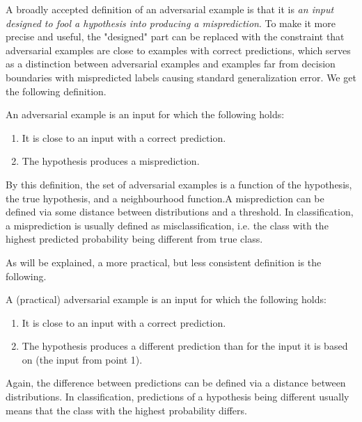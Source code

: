 \documentclass[oneside]{book}
\begin{document}
A broadly accepted definition of an adversarial example is that it is \textit{an input designed to fool a hypothesis into producing a misprediction}. To make it more precise and useful, the "designed" part can be replaced with the constraint that adversarial examples are close to examples with correct predictions, which serves as a distinction between adversarial examples and examples far from decision boundaries with mispredicted labels causing standard generalization error. We get the following definition.
\begin{definition} \label{def:ae-consistent}
	An adversarial example is an input for which the following holds:
	\begin{enumerate}
		\item It is close to an input with a correct prediction.
		\item The hypothesis produces a misprediction.
	\end{enumerate}
\end{definition}
By this definition, the set of adversarial examples is a function of the hypothesis, the true hypothesis, and a neighbourhood function.A misprediction can be defined via some distance between distributions and a threshold. In classification, a misprediction is usually defined as misclassification, i.e. the class with the highest predicted probability being different from true class.

As will be explained, a more practical, but less consistent definition is the following. 
\begin{definition} \label{def:ae-practical}
	A (practical) adversarial example is an input for which the following holds:
	\begin{enumerate}
		\item It is close to an input with a correct prediction.
		\item The hypothesis produces a different prediction than for the input it is based on (the input from point 1).
	\end{enumerate}
\end{definition}
Again, the difference between predictions can be defined via a distance between distributions.	
In classification, predictions of a hypothesis being different usually means that the class with the highest probability differs.
\end{document}
